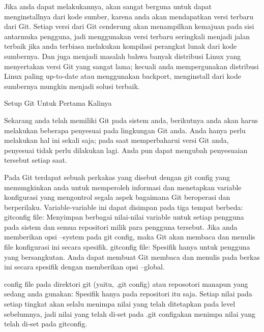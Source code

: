  \par
\noindent 
{\fontsize{14pt}{14pt}\selectfont Jika anda dapat melakukannya, akan sangat berguna untuk dapat menginstallnya dari kode sumber, karena anda akan mendapatkan versi terbaru dari Git. Setiap versi dari Git cenderung akan menampilkan kemajuan pada sisi antarmuka pengguna, jadi menggunakan versi terbaru seringkali menjadi jalan terbaik jika anda terbiasa melakukan kompilasi perangkat lunak dari kode sumbernya. Dan juga menjadi masalah bahwa banyak distribusi Linux yang menyertakan versi Git yang sangat lama; kecuali anda mempergunakan distribusi Linux paling up-to-date atau menggunakan backport, menginstall dari kode sumbernya mungkin menjadi solusi terbaik. \\} \par
\vspace{14pt}
\noindent 
{\fontsize{14pt}{14pt}\selectfont Setup Git Untuk Pertama Kalinya \\} \par
\noindent 
{\fontsize{14pt}{14pt}\selectfont Sekarang anda telah memiliki Git pada sistem anda, berikutnya anda akan harus melakukan beberapa penyesuai pada lingkungan Git anda. Anda hanya perlu melakukan hal ini sekali saja; pada saat memperbaharui versi Git anda, penyesuai tidak perlu dilakukan lagi. Anda pun dapat mengubah penyesuaian tersebut setiap saat. \\} \par
\noindent 
{\fontsize{14pt}{14pt}\selectfont Pada Git terdapat sebuah perkakas yang disebut dengan git config yang memungkinkan anda untuk memperoleh informasi dan menetapkan variable konfigurasi yang mengontrol segala aspek bagaimana Git beroperasi dan berperilaku. Variable-variable ini dapat disimpan pada tiga tempat berbeda: gitconfig $  $file: Menyimpan berbagai nilai-nilai variable untuk setiap pengguna pada sistem dan semua repositori milik para pengguna tersebut. Jika anda memberikan opsi $  $--system $  $pada $  $git config, maka Git akan membaca dan menulis file konfigurasi ini secara spesifik. gitconfig $  $file: Spesifik hanya untuk pengguna yang bersangkutan. Anda dapat membuat Git membaca dan menulis pada berkas ini secara spesifik dengan memberikan opsi $  $--global. \\} \par
\noindent 
{\fontsize{14pt}{14pt}\selectfont config file pada direktori git (yaitu, $  $.git config) atau reposotori manapun yang sedang anda gunakan: Spesifik hanya pada repositori itu saja. Setiap nilai pada setiap tingkat akan selalu menimpa nilai yang telah ditetapkan pada level sebelumnya, jadi nilai yang telah di-set pada $  $.git configakan menimpa nilai yang telah di-set pada $  $gitconfig. \\} \par
